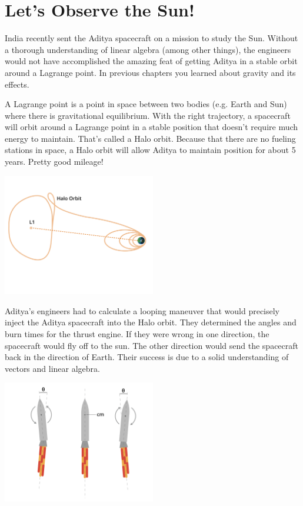 \section{Let's Observe the Sun!}
India recently sent the Aditya spacecraft on a mission to study the Sun. 
Without a thorough understanding of linear algebra (among other things), the 
engineers would not have accomplished the amazing feat of getting Aditya in a 
stable orbit around a Lagrange point. In previous chapters you learned about 
gravity and its effects. 

A Lagrange point is a point in space between two bodies (e.g. Earth and Sun) 
where there is gravitational equilibrium. With the right trajectory, a 
spacecraft will orbit around a Lagrange point in a stable position that 
doesn’t require much energy to maintain. That’s called a Halo orbit. Because 
that there are no fueling stations in space, a Halo orbit will allow Aditya to 
maintain position for about 5 years. Pretty good mileage!

\includegraphics[width=0.5\textwidth]{adityaOrbit.png}

Aditya’s engineers had to calculate a looping maneuver that would precisely 
inject the Aditya spacecraft into the Halo orbit. They determined the angles 
and burn times for the thrust engine. If they were wrong in one direction, the 
spacecraft would fly off to the sun. The other direction would send the 
spacecraft back in the direction of Earth. Their success is due to a solid 
understanding of vectors and linear algebra.

\includegraphics[width=0.5\textwidth]{gimbalEngine.png}

